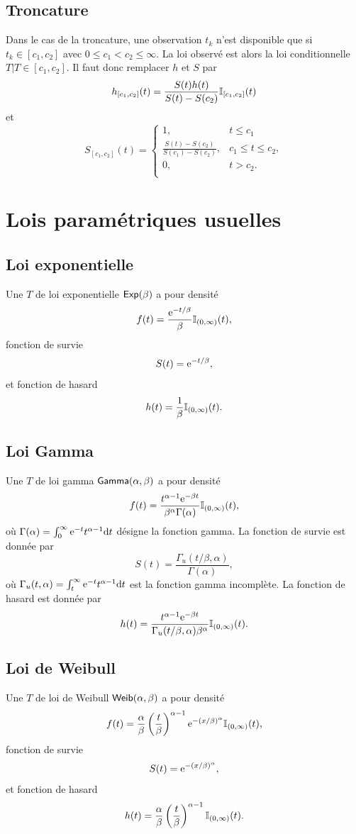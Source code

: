 \subsection{Troncature}\label{ssec:censureIII}
Dans le cas de la troncature, une observation $t_k$ n'est disponible que si $t_k\in[c_1,c_2]$ avec $0\leq c_1< c_2\leq \infty$. La loi observé est alors la loi conditionnelle $T|T\in[c_1,c_2]$. Il faut donc remplacer $h$ et $S$ par 
$$
h_{[c_1,c_2]}(t) = \frac{S(t)h(t)}{S(t) - S(c_2)}\mathbb{I}_{[c_1,c_2]}(t)
$$
et
$$
S_{[c_1,c_2]}(t) = \begin{cases}
1,&t\leq c_1\\
\frac{S(t)-S(c_2)}{S(c_1)-S(c_2)},&c_1\leq t\leq c_2,\\
0,&t> c_2.\\
\end{cases}
$$
\section{Lois paramétriques usuelles}\label{sec:common_parametric_model}
\subsection{Loi exponentielle}\label{ssec:exp}
\begin{definition}\label{def:loi_exponentielle}
Une \va $T$ de loi exponentielle $\mathsf{Exp}(\beta)$ a pour densité
$$
f(t) = \frac{\mathrm{e}^{- t/\beta}}{\beta}\mathbb{I}_{(0,\infty)}(t),
$$ 
fonction de survie
$$
S(t) = \mathrm{e}^{- t/\beta},
$$
et fonction de hasard
$$
h(t) = \frac{1}{\beta}\mathbb{I}_{(0,\infty)}(t).
$$
\end{definition}
\subsection{Loi Gamma}\label{ssec:gamma}
Une \va $T$ de loi gamma $\mathsf{Gamma}(\alpha, \beta)$ a pour densité
$$
f(t) = \frac{t^{\alpha-1}\mathrm{e}^{-\beta t}}{\beta^\alpha\Gamma(\alpha)}\mathbb{I}_{(0,\infty)}(t),
$$ 
où $\Gamma(\alpha) = \int_0^\infty \mathrm{e}^{-t}t^{\alpha-1}\text{d}t$ désigne la fonction gamma. La fonction de survie est donnée par
$$
S(t) = \frac{\Gamma_u(t/\beta, \alpha)}{\Gamma(\alpha)},
$$
où $\Gamma_u(t, \alpha) =\int_t^\infty\mathrm{e}^{-t}t^{\alpha-1}\text{d}t $ est la fonction gamma incomplète. La fonction de hasard est donnée par
$$
h(t) = \frac{t^{\alpha-1}\mathrm{e}^{-\beta t}}{\Gamma_u(t/\beta, \alpha)\beta^\alpha}\mathbb{I}_{(0,\infty)}(t).
$$
\subsection{Loi de Weibull}\label{ssec:weibull}
Une \va $T$ de loi de Weibull $\mathsf{Weib}(\alpha, \beta)$ a pour densité
$$
f(t) = \frac{\alpha}{\beta}\left(\frac{t}{\beta}\right)^{\alpha-1}\mathrm{e}^{-(x/\beta)^\alpha}\mathbb{I}_{(0,\infty)}(t),
$$ 
fonction de survie
$$
S(t) = \mathrm{e}^{-(x/\beta)^\alpha},
$$
et fonction de hasard
$$
h(t) = \frac{\alpha}{\beta}\left(\frac{t}{\beta}\right)^{\alpha-1}\mathbb{I}_{(0,\infty)}(t).
$$
